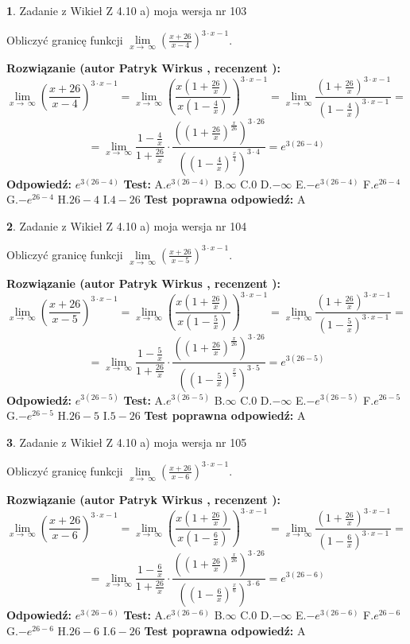 \documentclass[12pt, a4paper]{article}
\theoremstyle{definition} %
\newtheorem{zad}{}
\newcommand{\zadStart}[1]{\begin{zad}#1\newline}
\newcommand{\zadStop}{\end{zad}}
\newcommand{\rozwStart}[2]{\noindent \textbf{Rozwiązanie (autor #1 , recenzent #2): }\newline}
\newcommand{\rozwStop}{\newline}
\newcommand{\odpStart}{\noindent \textbf{Odpowiedź:}\newline}
\newcommand{\odpStop}{\newline}
\newcommand{\testStart}{\noindent \textbf{Test:}\newline}
\newcommand{\testStop}{\newline}
\newcommand{\kluczStart}{\noindent \textbf{Test poprawna odpowiedź:}\newline}
\newcommand{\kluczStop}{\newline}
\begin{document}
\zadStart{Zadanie z Wikieł Z 4.10 a) moja wersja nr 103}


Obliczyć granicę funkcji  $\lim\limits_{x\to\ \infty}(\frac{x+26}{x-4})^{3\cdot x-1}$.
\zadStop
\rozwStart{Patryk Wirkus}{}
$$\lim\limits_{x\to\ \infty}(\frac{x+26}{x-4})^{3\cdot x-1} = \lim\limits_{x\to\ \infty}(\frac{x(1+\frac{26}{x})}{x(1-\frac{4}{x})})^{3\cdot x-1}=\lim\limits_{x\to\ \infty}\frac{(1+\frac{26}{x})^{3\cdot x-1}}{(1-\frac{4}{x})^{3\cdot x-1}}=$$
$$=\lim\limits_{x\to\ \infty}\frac{1-\frac{4}{x}}{1+\frac{26}{x}}\cdot\frac{((1+\frac{26}{x})^{\frac{x}{26}})^{3\cdot26}}{((1-\frac{4}{x})^{\frac{x}{4}})^{3\cdot4}}=e^{3(26-4)}$$
\rozwStop
\odpStart
$e^{3(26-4)}$
\odpStop
\testStart
A.$e^{3(26-4)}$ B.$\infty$ C.$0$ D.$-\infty$ E.$-e^{3(26-4)}$
F.$e^{26-4}$ G.$-e^{26-4}$
H.$26-4$
I.$4-26$
\testStop
\kluczStart
A
\kluczStop



\zadStart{Zadanie z Wikieł Z 4.10 a) moja wersja nr 104}


Obliczyć granicę funkcji  $\lim\limits_{x\to\ \infty}(\frac{x+26}{x-5})^{3\cdot x-1}$.
\zadStop
\rozwStart{Patryk Wirkus}{}
$$\lim\limits_{x\to\ \infty}(\frac{x+26}{x-5})^{3\cdot x-1} = \lim\limits_{x\to\ \infty}(\frac{x(1+\frac{26}{x})}{x(1-\frac{5}{x})})^{3\cdot x-1}=\lim\limits_{x\to\ \infty}\frac{(1+\frac{26}{x})^{3\cdot x-1}}{(1-\frac{5}{x})^{3\cdot x-1}}=$$
$$=\lim\limits_{x\to\ \infty}\frac{1-\frac{5}{x}}{1+\frac{26}{x}}\cdot\frac{((1+\frac{26}{x})^{\frac{x}{26}})^{3\cdot26}}{((1-\frac{5}{x})^{\frac{x}{5}})^{3\cdot5}}=e^{3(26-5)}$$
\rozwStop
\odpStart
$e^{3(26-5)}$
\odpStop
\testStart
A.$e^{3(26-5)}$ B.$\infty$ C.$0$ D.$-\infty$ E.$-e^{3(26-5)}$
F.$e^{26-5}$ G.$-e^{26-5}$
H.$26-5$
I.$5-26$
\testStop
\kluczStart
A
\kluczStop



\zadStart{Zadanie z Wikieł Z 4.10 a) moja wersja nr 105}


Obliczyć granicę funkcji  $\lim\limits_{x\to\ \infty}(\frac{x+26}{x-6})^{3\cdot x-1}$.
\zadStop
\rozwStart{Patryk Wirkus}{}
$$\lim\limits_{x\to\ \infty}(\frac{x+26}{x-6})^{3\cdot x-1} = \lim\limits_{x\to\ \infty}(\frac{x(1+\frac{26}{x})}{x(1-\frac{6}{x})})^{3\cdot x-1}=\lim\limits_{x\to\ \infty}\frac{(1+\frac{26}{x})^{3\cdot x-1}}{(1-\frac{6}{x})^{3\cdot x-1}}=$$
$$=\lim\limits_{x\to\ \infty}\frac{1-\frac{6}{x}}{1+\frac{26}{x}}\cdot\frac{((1+\frac{26}{x})^{\frac{x}{26}})^{3\cdot26}}{((1-\frac{6}{x})^{\frac{x}{6}})^{3\cdot6}}=e^{3(26-6)}$$
\rozwStop
\odpStart
$e^{3(26-6)}$
\odpStop
\testStart
A.$e^{3(26-6)}$ B.$\infty$ C.$0$ D.$-\infty$ E.$-e^{3(26-6)}$
F.$e^{26-6}$ G.$-e^{26-6}$
H.$26-6$
I.$6-26$
\testStop
\kluczStart
A
\kluczStop
\end{document}
